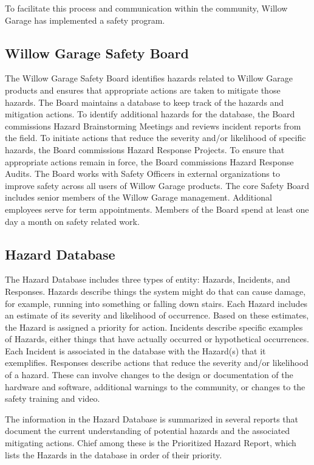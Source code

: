 To facilitate this process and communication within the community, Willow Garage has implemented a safety program.

\subsection{Willow Garage Safety Board}

The Willow Garage Safety Board identifies hazards related to Willow Garage products and ensures that appropriate actions are taken to mitigate those hazards. The Board maintains a database to keep track of the hazards and mitigation actions. To identify additional hazards for the database, the Board commissions Hazard Brainstorming Meetings and reviews incident reports from the field. To initiate actions that reduce the severity and/or likelihood of specific hazards, the Board commissions Hazard Response Projects. To ensure that appropriate actions remain in force, the Board commissions Hazard Response Audits. The Board works with Safety Officers in external organizations to improve safety across all users of Willow Garage products.
The core Safety Board includes senior members of the Willow Garage management. Additional employees serve for term appointments. Members of the Board spend at least one day a month on safety related work.
\subsection{Hazard Database}

The Hazard Database includes three types of entity: Hazards, Incidents, and Responses.
Hazards describe things the system might do that can cause damage, for example, running into something or falling down stairs. Each Hazard includes an estimate of its severity and likelihood of occurrence. Based on these estimates, the Hazard is assigned a priority for action.
Incidents describe specific examples of Hazards, either things that have actually occurred or hypothetical occurrences. Each Incident is associated in the database with the Hazard(s) that it exemplifies. 
Responses describe actions that reduce the severity and/or likelihood of a hazard. These can involve changes to the design or documentation of the hardware and software, additional warnings to the community, or changes to the safety training and video.

The information in the Hazard Database is summarized in several reports that document the current understanding of potential hazards and the associated mitigating actions. Chief among these is the Prioritized Hazard Report, which lists the Hazards in the database in order of their priority.

